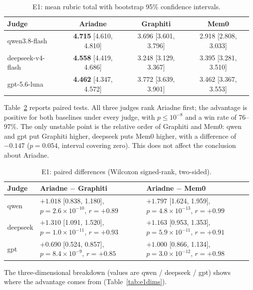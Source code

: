 \documentclass[11pt]{article}
\begin{document}
\begin{table}[t]
  \centering
  \small
  \begin{tabular}{@{}lccc@{}}
    \toprule
    Judge & Ariadne & Graphiti & Mem0 \\
    \midrule
    qwen3.8-flash & \textbf{4.715} [4.610, 4.810] & 3.696 [3.601, 3.796] & 2.918 [2.808, 3.033] \\
    deepseek-v4-flash & \textbf{4.558} [4.419, 4.686] & 3.248 [3.129, 3.367] & 3.395 [3.281, 3.510] \\
    gpt-5.6-luna & \textbf{4.462} [4.347, 4.572] & 3.772 [3.639, 3.901] & 3.462 [3.367, 3.553] \\
    \bottomrule
  \end{tabular}
  \caption{E1: mean rubric total with bootstrap 95\% confidence intervals.}\label{tab:e1means}
\end{table}

Table~\ref{tab:e1tests} reports paired tests. All three judges rank Ariadne first; the advantage
is positive for both baselines under every judge, with $p\le10^{-8}$ and a win rate of
76--97\%. The only unstable point is the relative order of Graphiti and Mem0: qwen and gpt put
Graphiti higher, deepseek puts Mem0 higher, with a difference of $-0.147$ ($p=0.054$, interval
covering zero). This does not affect the conclusion about Ariadne.

\begin{table}[t]
  \centering
  \small
  \begin{tabular}{@{}lll@{}}
    \toprule
    Judge & Ariadne $-$ Graphiti & Ariadne $-$ Mem0 \\
    \midrule
    qwen & $+1.018$ [0.838, 1.180], $p=2.6\times10^{-10}$, $r=+0.89$
         & $+1.797$ [1.624, 1.959], $p=4.8\times10^{-13}$, $r=+0.99$ \\
    deepseek & $+1.310$ [1.091, 1.520], $p=1.0\times10^{-11}$, $r=+0.93$
             & $+1.163$ [0.953, 1.353], $p=5.9\times10^{-11}$, $r=+0.91$ \\
    gpt & $+0.690$ [0.524, 0.857], $p=8.4\times10^{-9}$, $r=+0.85$
        & $+1.000$ [0.866, 1.134], $p=3.0\times10^{-12}$, $r=+0.98$ \\
    \bottomrule
  \end{tabular}
  \caption{E1: paired differences (Wilcoxon signed-rank, two-sided).}\label{tab:e1tests}
\end{table}

The three-dimensional breakdown (values are qwen / deepseek / gpt) shows where the advantage
comes from (Table~\ref{tab:e1dims}).
\end{document}
